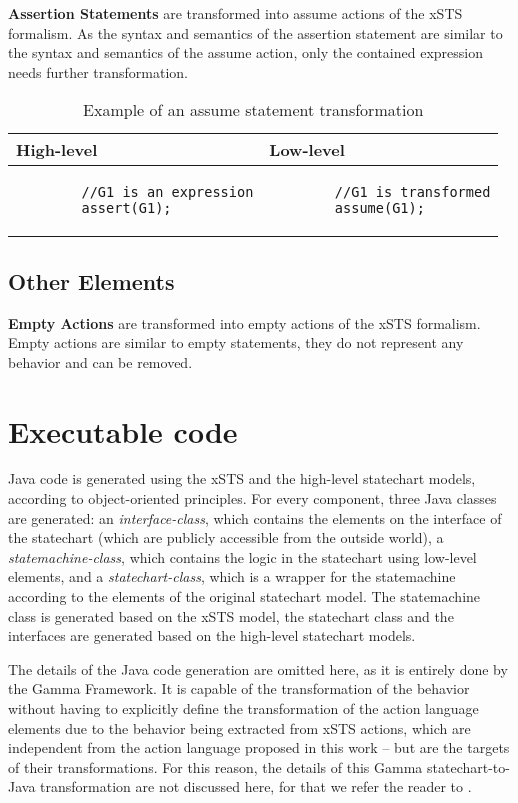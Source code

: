 \bigskip
\textbf{Assertion Statements} are transformed into assume actions of the xSTS formalism. As the syntax and semantics of the assertion statement are similar to the syntax and semantics of the assume action, only the contained expression needs further transformation.

\begin{table}[H]
	\footnotesize
	\centering
	\begin{tabular}{ p{7cm} p{7cm} }
		\toprule
		High-level & Low-level \\
		\midrule
		\begin{lstlisting}
		//G1 is an expression
		assert(G1);\end{lstlisting} & 
		\begin{lstlisting}
		//G1 is transformed
		assume(G1);\end{lstlisting} \\
		\bottomrule
	\end{tabular}
	\caption{Example of an assume statement transformation}
	\label{tab:LLXSTSAssumeStatementExample}
\end{table}

\subsection{Other Elements}
\bigskip
\textbf{Empty Actions} are transformed into empty actions of the xSTS formalism. Empty actions are similar to empty statements, they do not represent any behavior and can be removed.

\section{Executable code} \label{section_tr_java}
Java code is generated using the xSTS and the high-level statechart models, according to object-oriented principles. For every component, three Java classes are generated: an \textit{interface-class}, which contains the elements on the interface of the statechart (which are publicly accessible from the outside world), a \textit{statemachine-class}, which contains the logic in the statechart using low-level elements, and a \textit{statechart-class}, which is a wrapper for the statemachine according to the elements of the original statechart model. The statemachine class is generated based on the xSTS model, the statechart class and the interfaces are generated based on the high-level statechart models.

The details of the Java code generation are omitted here, as it is entirely done by the Gamma Framework. It is capable of the transformation of the behavior without having to explicitly define the transformation of the action language elements due to the behavior being extracted from xSTS actions, which are independent from the action language proposed in this work -- but are the targets of their transformations. For this reason, the details of this Gamma statechart-to-Java transformation are not discussed here, for that we refer the reader to \cite{BenceDipterv, GammaVince2018}. 
